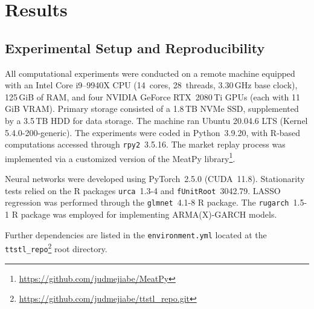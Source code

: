 \documentclass[10pt,a4paper,oneside]{article}
\begin{document}

\section{Results}
\label{sec:results}

\subsection{Experimental Setup and Reproducibility}
\label{subsec:exp_setup}

All computational experiments were conducted on a remote machine equipped with an Intel Core i9--9940X CPU (14~cores, 28~threads, 3.30\,GHz base clock), 125\,GiB of RAM, and four NVIDIA GeForce RTX~2080\,Ti GPUs (each with 11\,GiB VRAM). Primary storage consisted of a 1.8\,TB NVMe SSD, supplemented by a 3.5\,TB HDD for data storage. The machine ran Ubuntu 20.04.6 LTS (Kernel 5.4.0-200-generic). The experiments were coded in Python~3.9.20, with R-based computations accessed through \verb|rpy2|~3.5.16. The market replay process was implemented via a customized version of the MeatPy library\footnote{\url{https://github.com/judmejiabe/MeatPy}}.

Neural networks were developed using PyTorch~2.5.0 (CUDA~11.8). Stationarity tests relied on the R packages \verb|urca|~1.3-4 and \verb|fUnitRoot|~3042.79. LASSO regression was performed through the \verb|glmnet|~4.1-8 R package. The \verb|rugarch|~1.5-1 R package was employed for implementing ARMA(X)-GARCH models.

Further dependencies are listed in the \verb|environment.yml| located at the \verb|ttstl_repo|\footnote{\url{https://github.com/judmejiabe/ttstl_repo.git}} root directory.
\end{document}

